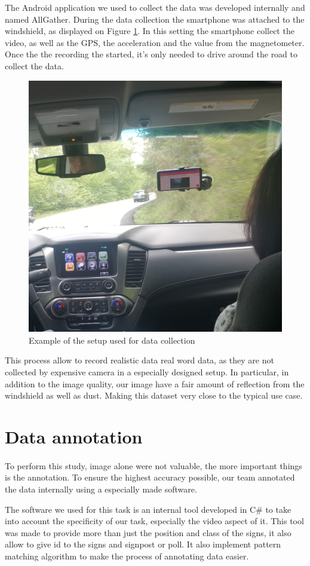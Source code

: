 \begin{appendices}
The Android application we used to collect the data was developed internally and named AllGather. During the data collection the smartphone was attached to the windshield, as displayed on Figure \ref{fig:windshield}. In this setting the smartphone collect the video, as well as the GPS, the acceleration and the value from the magnetometer. Once the the recording the started, it's only needed to drive around the road to collect the data.

\begin{figure}
    \centering
    \includegraphics[width=0.5\linewidth]{figures/smartphone-datacolection.jpg}
    \caption{Example of the setup used for data collection}
    \label{fig:windshield}
\end{figure}{}


This process allow to record realistic data real word data, as they are not collected by expensive camera in a especially designed setup. In particular, in addition to the image quality, our image have a fair amount of reflection from the windshield as well as dust. Making this dataset very close to the typical use case.


\section{Data annotation}
\paragraph{}
To perform this study, image alone were not valuable, the more important things is the annotation. To ensure the highest accuracy possible, our team annotated the data internally using a especially made software. 

The software we used for this task is an internal tool developed in C\# to take into account the specificity of our task, especially the video aspect of it. This tool was made to provide more than just the position and class of the signs, it also allow to give id to the signs and signpost or poll. It also implement pattern matching algorithm to make the process of annotating data easier.


\end{appendices}
